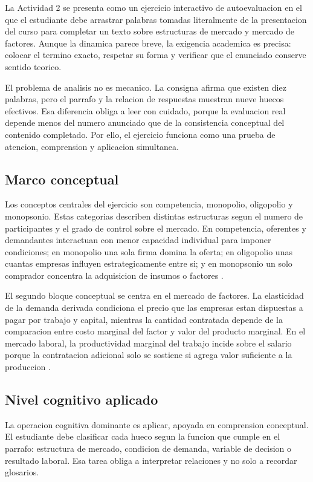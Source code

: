 \documentclass[
	spanish,
	letterpaper, oneside
]{article}
\begin{document}
La Actividad 2 se presenta como un ejercicio interactivo de autoevaluacion en el que el estudiante debe arrastrar palabras tomadas literalmente de la presentacion del curso para completar un texto sobre estructuras de mercado y mercado de factores. Aunque la dinamica parece breve, la exigencia academica es precisa: colocar el termino exacto, respetar su forma y verificar que el enunciado conserve sentido teorico.

El problema de analisis no es mecanico. La consigna afirma que existen diez palabras, pero el parrafo y la relacion de respuestas muestran nueve huecos efectivos. Esa diferencia obliga a leer con cuidado, porque la evaluacion real depende menos del numero anunciado que de la consistencia conceptual del contenido completado. Por ello, el ejercicio funciona como una prueba de atencion, comprension y aplicacion simultanea.

\subsection{Marco conceptual}

Los conceptos centrales del ejercicio son competencia, monopolio, oligopolio y monopsonio. Estas categorias describen distintas estructuras segun el numero de participantes y el grado de control sobre el mercado. En competencia, oferentes y demandantes interactuan con menor capacidad individual para imponer condiciones; en monopolio una sola firma domina la oferta; en oligopolio unas cuantas empresas influyen estrategicamente entre si; y en monopsonio un solo comprador concentra la adquisicion de insumos o factores \citep{ucnlPresentacionMicroeconomia2026,pindyck2018microeconomia}.

El segundo bloque conceptual se centra en el mercado de factores. La elasticidad de la demanda derivada condiciona el precio que las empresas estan dispuestas a pagar por trabajo y capital, mientras la cantidad contratada depende de la comparacion entre costo marginal del factor y valor del producto marginal. En el mercado laboral, la productividad marginal del trabajo incide sobre el salario porque la contratacion adicional solo se sostiene si agrega valor suficiente a la produccion \citep{pindyck2018microeconomia}.

\subsection{Nivel cognitivo aplicado}

La operacion cognitiva dominante es aplicar, apoyada en comprension conceptual. El estudiante debe clasificar cada hueco segun la funcion que cumple en el parrafo: estructura de mercado, condicion de demanda, variable de decision o resultado laboral. Esa tarea obliga a interpretar relaciones y no solo a recordar glosarios.
\end{document}
